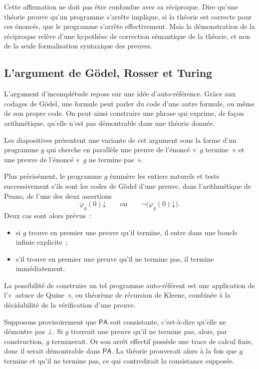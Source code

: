 \thingy
Cette affirmation ne doit pas être confondue avec sa réciproque.  Dire
qu'une théorie prouve qu'un programme s'arrête implique, si la théorie
est correcte pour ces énoncés, que le programme s'arrête effectivement.
Mais la démonstration de la réciproque relève d'une hypothèse de
correction sémantique de la théorie, et non de la seule formalisation
syntaxique des preuves.


\subsection{L'argument de Gödel, Rosser et Turing}

\thingy
L'argument d'incomplétude repose sur une idée d'auto-référence.  Grâce
aux codages de Gödel, une formule peut parler du code d'une autre formule,
ou même de son propre code.  On peut ainsi construire une phrase qui
exprime, de façon arithmétique, qu'elle n'est pas démontrable dans une
théorie donnée.

Les diapositives présentent une variante de cet argument sous la forme
d'un programme $g$ qui cherche en parallèle une preuve de l'énoncé
« $g$ termine » et une preuve de l'énoncé « $g$ ne termine pas ».

\thingy
Plus précisément, le programme $g$ énumère les entiers naturels et teste
successivement s'ils sont les codes de Gödel d'une preuve, dans
l'arithmétique de Peano, de l'une des deux assertions
\[
\varphi_g(0)\mathord\downarrow
\qquad\text{ou}\qquad
\neg\bigl(\varphi_g(0)\mathord\downarrow\bigr).
\]
Deux cas sont alors prévus :
\begin{itemize}
\item si $g$ trouve en premier une preuve qu'il termine, il entre dans
  une boucle infinie explicite ;
\item s'il trouve en premier une preuve qu'il ne termine pas, il
  termine immédiatement.
\end{itemize}

La possibilité de construire un tel programme auto-référent est une
application de l'« astuce de Quine », ou théorème de récursion de
Kleene, combinée à la décidabilité de la vérification d'une preuve.

\thingy
Supposons provisoirement que $\mathsf{PA}$ soit consistante, c'est-à-dire
qu'elle ne démontre pas $\bot$.  Si $g$ trouvait une preuve qu'il ne
termine pas, alors, par construction, $g$ terminerait.  Or son
arrêt effectif possède une trace de calcul finie, donc il serait
démontrable dans $\mathsf{PA}$.  La théorie prouverait alors à la fois
que $g$ termine et qu'il ne termine pas, ce qui contredirait la
consistance supposée.

